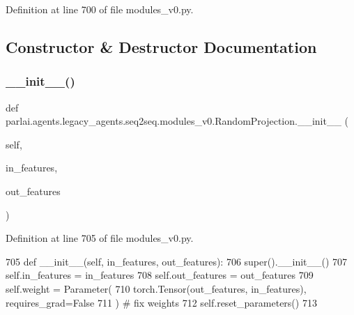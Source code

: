Definition at line 700 of file modules\+\_\+v0.\+py.



\subsection{Constructor \& Destructor Documentation}
\mbox{\label{classparlai_1_1agents_1_1legacy__agents_1_1seq2seq_1_1modules__v0_1_1RandomProjection_ab509b80358309b000bdd54ff89117ae5}} 
\subsubsection{\texorpdfstring{\+\_\+\+\_\+init\+\_\+\+\_\+()}{\_\_init\_\_()}}
{\footnotesize\ttfamily def parlai.\+agents.\+legacy\+\_\+agents.\+seq2seq.\+modules\+\_\+v0.\+Random\+Projection.\+\_\+\+\_\+init\+\_\+\+\_\+ (\begin{DoxyParamCaption}\item[{}]{self,  }\item[{}]{in\+\_\+features,  }\item[{}]{out\+\_\+features }\end{DoxyParamCaption})}



Definition at line 705 of file modules\+\_\+v0.\+py.


\begin{DoxyCode}
705     \textcolor{keyword}{def }\_\_init\_\_(self, in\_features, out\_features):
706         super().\_\_init\_\_()
707         self.in\_features = in\_features
708         self.out\_features = out\_features
709         self.weight = Parameter(
710             torch.Tensor(out\_features, in\_features), requires\_grad=\textcolor{keyword}{False}
711         )  \textcolor{comment}{# fix weights}
712         self.reset\_parameters()
713 
\end{DoxyCode}


